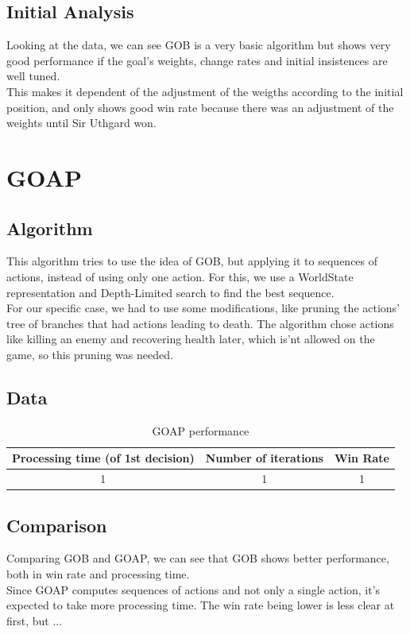 \documentclass{article}
\begin{document}
  \subsection{Initial Analysis}
  Looking at the data, we can see GOB is a very basic algorithm but shows very good performance if the goal's weights, change rates and initial insistences are well tuned.\\
  This makes it dependent of the adjustment of the weigths according to the initial position, and only shows good win rate because there was an adjustment of the weights
  until Sir Uthgard won. 
  \section{GOAP}
  \subsection{Algorithm}
  This algorithm tries to use the idea of GOB, but applying it to sequences of actions, instead of using only one action. For this, we use a WorldState representation 
  and Depth-Limited search to find the best sequence.\\
  For our specific case, we had to use some modifications, like pruning the actions' tree of branches that had actions leading to death. The algorithm chose actions like killing
  an enemy and recovering health later, which is'nt allowed on the game, so this pruning was needed.
  \subsection{Data}
  \begin{table}[h!]
    \centering
    \caption{GOAP performance}
    \label{tab:tableGOAP1}
    \begin{tabular}{c|c|c}
      \textbf{Processing time (of 1st decision)} & \textbf{Number of iterations} & \textbf{Win Rate}\\
      \hline
      1 & 1 & 1
    \end{tabular}
  \end{table}
  \subsection{Comparison}
  Comparing GOB and GOAP, we can see that GOB shows better performance, both in win rate and processing time. \\
  Since GOAP computes sequences of actions and not only a single action, it's expected to take more processing time. The win rate being lower is less clear at first, but
  ...
  
\end{document}

